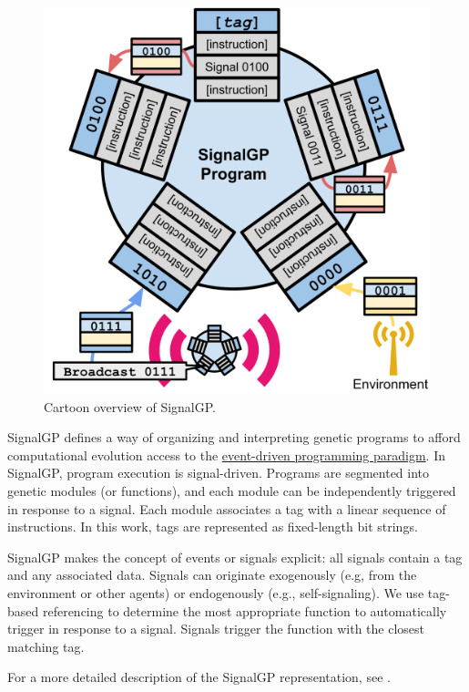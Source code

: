 \documentclass[]{book}
\begin{document}
\begin{figure}
\centering
\includegraphics{./media/sgp-cartoon.png}
\caption{Cartoon overview of SignalGP.}
\end{figure}

SignalGP defines a way of organizing and interpreting genetic programs to afford computational evolution access to the \href{https://en.wikipedia.org/wiki/Event-driven_programming}{event-driven programming paradigm}.
In SignalGP, program execution is signal-driven.
Programs are segmented into genetic modules (or functions), and each module can be independently triggered in response to a signal.
Each module associates a tag with a linear sequence of instructions.
In this work, tags are represented as fixed-length bit strings.

SignalGP makes the concept of events or signals explicit: all signals contain a tag and any associated
data.
Signals can originate exogenously (e.g, from the environment or other agents) or endogenously (e.g., self-signaling).
We use tag-based referencing to determine the most appropriate function to automatically trigger in
response to a signal.
Signals trigger the function with the closest matching tag.

For a more detailed description of the SignalGP representation, see \citep{lalejini_evolving_2018}.
\end{document}
